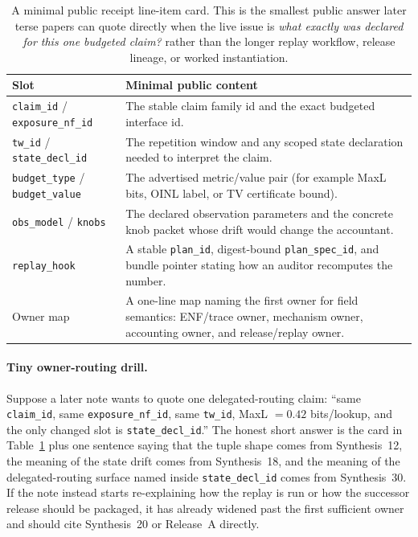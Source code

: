 \documentclass[11pt]{article}
\begin{document}
\begin{table}[t]
\centering\small
\begin{tabularx}{\linewidth}{@{}lX@{}}
\toprule
Slot & Minimal public content \\ 
\midrule
\texttt{claim\_id} / \texttt{exposure\_nf\_id} & The stable claim family id and the exact budgeted interface id. \\ 
\texttt{tw\_id} / \texttt{state\_decl\_id} & The repetition window and any scoped state declaration needed to interpret the claim. \\ 
\texttt{budget\_type} / \texttt{budget\_value} & The advertised metric/value pair (for example MaxL bits, OINL label, or TV certificate bound). \\ 
\texttt{obs\_model} / \texttt{knobs} & The declared observation parameters and the concrete knob packet whose drift would change the accountant. \\ 
\texttt{replay\_hook} & A stable \texttt{plan\_id}, digest-bound \texttt{plan\_spec\_id}, and bundle pointer stating how an auditor recomputes the number. \\ 
Owner map & A one-line map naming the first owner for field semantics: ENF/trace owner, mechanism owner, accounting owner, and release/replay owner. \\ 
\bottomrule
\end{tabularx}
\caption{A minimal public receipt line-item card. This is the smallest public answer later terse papers can quote directly when the live issue is \emph{what exactly was declared for this one budgeted claim?} rather than the longer replay workflow, release lineage, or worked instantiation.}
\label{tab:minlineitemcard}
\end{table}

\paragraph{Tiny owner-routing drill.}
Suppose a later note wants to quote one delegated-routing claim: ``same \texttt{claim\_id}, same \texttt{exposure\_nf\_id}, same \texttt{tw\_id}, MaxL $=0.42$ bits/lookup, and the only changed slot is \texttt{state\_decl\_id}.'' The honest short answer is the card in Table~\ref{tab:minlineitemcard} plus one sentence saying that the tuple shape comes from Synthesis~12, the meaning of the state drift comes from Synthesis~18, and the meaning of the delegated-routing surface named inside \texttt{state\_decl\_id} comes from Synthesis~30. If the note instead starts re-explaining how the replay is run or how the successor release should be packaged, it has already widened past the first sufficient owner and should cite Synthesis~20 or Release~A directly.\cite{series:planstateequiv,series:deployedsurfaces,series:auditorreplay,series:releaseproperty}
\end{document}
